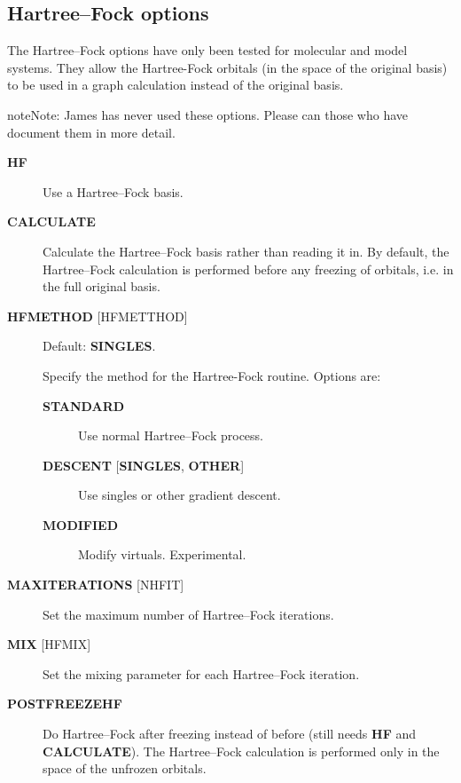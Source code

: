 \documentclass[openany,a4paper,10pt,english]{manual}
\begin{document}
\subsection{Hartree--Fock options}

The Hartree--Fock options have only been tested for molecular and model systems.
They allow the Hartree-Fock orbitals (in the space of the original basis) to be used
in a graph calculation instead of the original basis.

\begin{notice}{note}{Note:}
James has never used these options.  Please can those who have document them in more detail.
\end{notice}
\begin{description}
\item[\textbf{HF}] \leavevmode
Use a Hartree--Fock basis.

\item[\textbf{CALCULATE}] \leavevmode
Calculate the Hartree--Fock basis rather than reading it in.  By default,
the Hartree--Fock calculation is performed before any freezing of orbitals,
i.e. in the full original basis.

\item[\textbf{HFMETHOD} {[}HFMETTHOD{]}] \leavevmode
Default: \textbf{SINGLES}.

Specify the method for the Hartree-Fock routine.  Options are:
\begin{description}
\item[\textbf{STANDARD}] \leavevmode
Use normal Hartree--Fock process.

\item[\textbf{DESCENT} {[}\textbf{SINGLES}, \textbf{OTHER}{]}] \leavevmode
Use singles or other gradient descent.

\item[\textbf{MODIFIED}] \leavevmode
Modify virtuals.  Experimental.

\end{description}

\item[\textbf{MAXITERATIONS} {[}NHFIT{]}] \leavevmode
Set the maximum number of Hartree--Fock iterations.

\item[\textbf{MIX} {[}HFMIX{]}] \leavevmode
Set the mixing parameter for each Hartree--Fock iteration.

\item[\textbf{POSTFREEZEHF}] \leavevmode
Do Hartree--Fock after freezing instead of before (still needs \textbf{HF}
and \textbf{CALCULATE}).  The Hartree--Fock calculation is performed only
in the space of the unfrozen orbitals.


\end{description}
\end{document}
